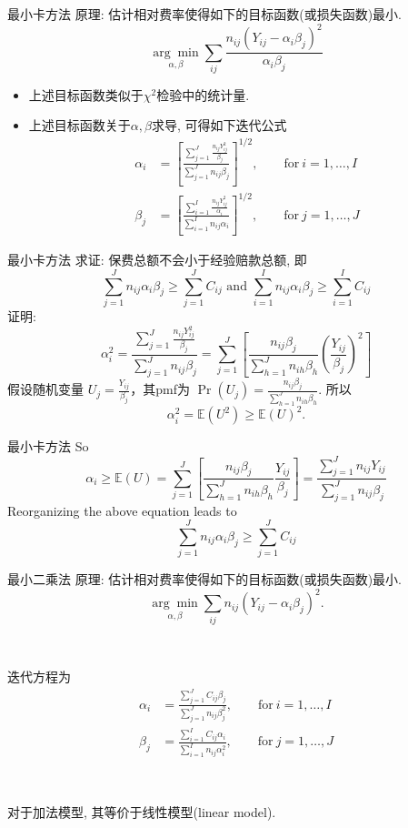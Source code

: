 \documentclass[professionalfont]{beamer}
\def\E{{\mathbb E}}
\begin{document}
\begin{frame}{最小卡方法}
原理: 估计相对费率使得如下的目标函数(或损失函数)最小.
$$\underset{\alpha,\beta}{\arg \min}\sum_{ij}\frac{n_{ij}(Y_{ij}-\alpha_i\beta_j)^2}{\alpha_i\beta_j}$$
\begin{itemize}
	\item 上述目标函数类似于$\chi^2$检验中的统计量.
	\item 上述目标函数关于$\alpha,\beta$求导, 可得如下迭代公式
		\begin{equation}\label{chi1}
		\begin{aligned}
		\alpha_i&=\left[\frac{\sum_{j=1}^{J}\frac{n_{ij}Y_{ij}^2}{\beta_j}}{\sum_{j=1}^Jn_{ij}\beta_j}\right]^{1/2},\qquad \text{for} ~ i=1,\ldots,I\\
		\beta_j&=\left[\frac{\sum_{i=1}^{I}\frac{n_{ij}Y_{ij}^2}{\alpha_i}}{\sum_{i=1}^In_{ij}\alpha_i}\right]^{1/2},\qquad \text{for} ~ j=1,\ldots,J
		\end{aligned}
		\end{equation}
\end{itemize}
\end{frame}
\begin{frame}{最小卡方法}
求证: 保费总额不会小于经验赔款总额, 即 $$\sum_{j=1}^Jn_{ij}\alpha_i\beta_j\geq\sum_{j=1}^JC_{ij}\text{ and } \sum_{i=1}^In_{ij}\alpha_i\beta_j\geq\sum_{i=1}^IC_{ij}$$
证明: $$\alpha_i^2=\frac{\sum_{j=1}^{J}\frac{n_{ij}Y_{ij}^2}{\beta_j}}{\sum_{j=1}^Jn_{ij}\beta_j}=\sum_{j=1}^J\left[\frac{n_{ij}\beta_{j}}{\sum_{h=1}^Jn_{ih}\beta_h}\left(\frac{Y_{ij}}{\beta_j}\right)^2\right]$$
假设随机变量 $U_j=\frac{Y_{ij}}{\beta_j}$，其pmf为 $\Pr(U_j)=\frac{n_{ij}\beta_{j}}{\sum_{h=1}^Jn_{ih}\beta_h}$. 所以
$$\alpha_i^2=\E(U^2)\geq\E(U)^2.$$


\end{frame}
\begin{frame}{最小卡方法}
	So 
	$$\alpha_i\geq\E(U)=\sum_{j=1}^J\left[\frac{n_{ij}\beta_{j}}{\sum_{h=1}^Jn_{ih}\beta_h}\frac{Y_{ij}}{\beta_j}\right]=\frac{\sum_{j=1}^Jn_{ij}Y_{ij}}{\sum_{j=1}^Jn_{ij}\beta_j}$$
	Reorganizing the above equation leads to
	$$\sum_{j=1}^Jn_{ij}\alpha_i\beta_j\geq\sum_{j=1}^JC_{ij}$$
\end{frame}
\begin{frame}{最小二乘法}
原理: 估计相对费率使得如下的目标函数(或损失函数)最小.
$$\underset{\alpha,\beta}{\arg \min}\sum_{ij}n_{ij}(Y_{ij}-\alpha_i\beta_j)^2.$$

~

迭代方程为
\begin{equation}\label{ls1}
\begin{aligned}
\alpha_i&=\frac{\sum_{j=1}^JC_{ij}\beta_j}{\sum_{j=1}^Jn_{ij}\beta^2_j},\qquad \text{for} ~ i=1,\ldots,I\\
\beta_j&=\frac{\sum_{i=1}^IC_{ij}\alpha_i}{\sum_{i=1}^In_{ij}\alpha^2_i},\qquad \text{for} ~ j=1,\ldots,J
\end{aligned}
\end{equation}

~

对于加法模型, 其等价于线性模型(linear model).	
\end{frame}
\end{document}
